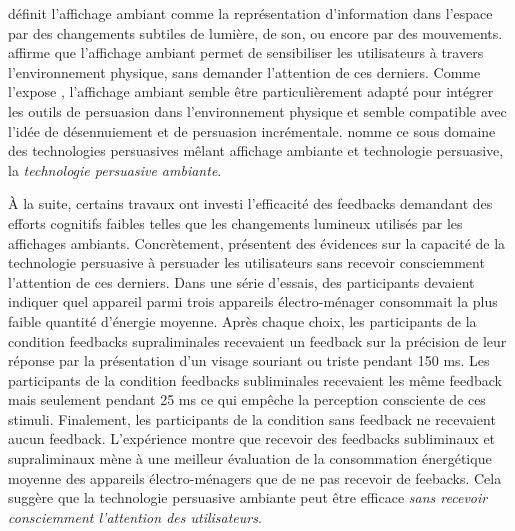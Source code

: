 \documentclass[10pt,a5paper,twoside]{article}
\begin{document}
\citet{ishii1997tangible} définit l'affichage ambiant comme la
représentation d'information dans l'espace par des changements subtiles
de lumière, de son, ou encore par des mouvements.
\citet{wisneski1998ambient} affirme que l'affichage ambiant permet de
sensibiliser les utilisateurs à travers l'environnement physique, sans
demander l'attention de ces derniers. Comme l'expose
\citet{davis2008towards}, l'affichage ambiant semble être
particulièrement adapté pour intégrer les outils de persuasion dans
l'environnement physique et semble compatible avec l'idée de
désennuiement et de persuasion incrémentale. \citet{davis2008towards}
nomme ce sous domaine des technologies persuasives mêlant affichage
ambiante et technologie persuasive, la \emph{technologie persuasive
ambiante}.

À la suite, certains travaux ont investi l'efficacité des feedbacks
demandant des efforts cognitifs faibles telles que les changements
lumineux utilisés par les affichages ambiants. Concrètement,
\citet{ham2009can} présentent des évidences sur la capacité de la
technologie persuasive à persuader les utilisateurs sans recevoir
consciemment l'attention de ces derniers. Dans une série d'essais, des
participants devaient indiquer quel appareil parmi trois appareils
électro-ménager consommait la plus faible quantité d'énergie moyenne.
Après chaque choix, les participants de la condition feedbacks
supraliminales recevaient un feedback sur la précision de leur réponse
par la présentation d'un visage souriant ou triste pendant 150 ms. Les
participants de la condition feedbacks subliminales recevaient les même
feedback mais seulement pendant 25 ms ce qui empêche la perception
consciente de ces stimuli. Finalement, les participants de la condition
sans feedback ne recevaient aucun feedback. L'expérience montre que
recevoir des feedbacks subliminaux et supraliminaux mène à une meilleur
évaluation de la consommation énergétique moyenne des appareils
électro-ménagers que de ne pas recevoir de feebacks. Cela suggère que la
technologie persuasive ambiante peut être efficace \emph{sans recevoir
consciemment l'attention des utilisateurs}.
\end{document}
